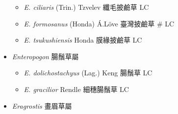 \begin{itemize}
  \begin{itemize}
        \item[] \textit{E. ciliaris} (Trin.) Tzvelev  纖毛披鹼草   LC
        \item[] \textit{E. formosanus} (Honda) Á.Löve  臺灣披鹼草  \# LC
        \item[] \textit{E. tsukushiensis} Honda  膜緣披鹼草   LC
  \end{itemize}
 \item[] \textit{Enteropogon} 腸鬚草屬
                                
  \begin{itemize}
        \item[] \textit{E. dolichostachyus} (Lag.) Keng  腸鬚草   LC
        \item[] \textit{E. gracilior} Rendle  細穗腸鬚草   LC
  \end{itemize}
 \item[] \textit{Eragrostis} 畫眉草屬
                                

\end{itemize}
